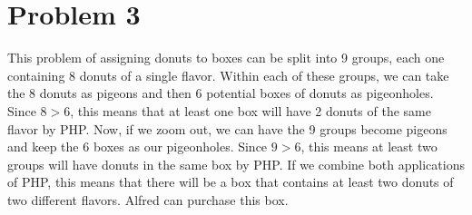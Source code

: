 \documentclass{article}
\begin{document}
\section{Problem 3}

This problem of assigning donuts to boxes can be split into 9 groups, each one containing 8 donuts of a single flavor. Within each of these groups, we can take the 8 donuts as pigeons and then 6 potential boxes of donuts as pigeonholes. Since $8 > 6$, this means that at least one box will have 2 donuts of the same flavor by PHP. Now, if we zoom out, we can have the 9 groups become pigeons and keep the 6 boxes as our pigeonholes. Since $9 > 6$, this means at least two groups will have donuts in the same box by PHP. If we combine both applications of PHP, this means that there will be a box that contains at least two donuts of two different flavors. Alfred can purchase this box.
\end{document}
